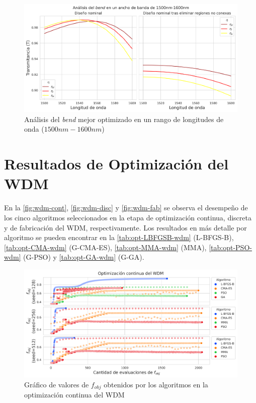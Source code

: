 \begin{figure}[ht]
  \centering
  \includegraphics[width=\textwidth]{image/results/bend/best/broadband-bend.png}
  \caption{Análisis del \emph{bend} mejor optimizado en un rango de longitudes de onda ($1500 nm-1600 nm$)}
  \label{fig:broadband-bend}
\end{figure}

\section{Resultados de Optimización del WDM}\label{sec:results-wdm}


En la \autoref{fig:wdm-cont}, \autoref{fig:wdm-disc} y \autoref{fig:wdm-fab} se observa 
el desempeño de los cinco algoritmos seleccionados en la etapa de optimización continua, discreta y
de fabricación del WDM, respectivamente.
Los resultados en más detalle por algoritmo se pueden encontrar en la
\autoref{tab:opt-LBFGSB-wdm} (L-BFGS-B),
\autoref{tab:opt-CMA-wdm} (G-CMA-ES),
\autoref{tab:opt-MMA-wdm} (MMA),
\autoref{tab:opt-PSO-wdm} (G-PSO) y
\autoref{tab:opt-GA-wdm} (G-GA).

\begin{landscape}
\begin{figure}[ht]
  \centering
  \includegraphics[scale=1.0]{image/results/wdm/wdm-opt-cont.png}
  \caption{Gráfico de valores de $f_{obj}$ obtenidos por los algoritmos en la optimización continua del WDM}
  \label{fig:wdm-cont}
\end{figure}
\end{landscape}

